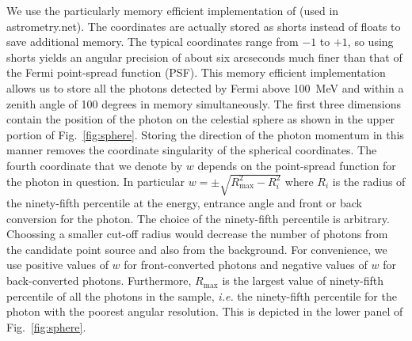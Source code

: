 \documentclass[useAMS,usenatbib]{mn2e}
\begin{document}
We use the particularly memory efficient implementation of
\citet{LangPhD} (used in astrometry.net).  The coordinates are
actually stored as shorts instead of floats to save additional memory.
The typical coordinates range from $-1$ to $+1$, so using shorts
yields an angular precision of about six arcseconds much finer than
that of the Fermi point-spread function (PSF).  This memory efficient
implementation allows us to store all the photons detected by Fermi
above 100~MeV and within a zenith angle of 100 degrees in memory
simultaneously.  The first three dimensions contain the position of
the photon on the celestial sphere as shown in the upper portion of
Fig.~\ref{fig:sphere}.  Storing the direction of the photon momentum
in this manner removes the coordinate singularity of the spherical
coordinates.
The fourth
coordinate that we denote by $w$ depends on the point-spread function
for the photon in question.  In particular $w=\pm
\sqrt{R^2_\mathrm{max}-R_i^2}$ where $R_i$ is the radius of the
ninety-fifth percentile at the energy, entrance angle and front or
back conversion for the photon.  The choice of the ninety-fifth
percentile is arbitrary.  Choossing a smaller cut-off radius would
decrease the number of photons from the candidate point source and also
from the background.  For convenience, we use positive values of $w$
for front-converted photons and negative values of $w$ for
back-converted photons.  Furthermore, $R_\mathrm{max}$ is the largest
value of ninety-fifth percentile of all the photons in the sample,
{\em i.e.} the ninety-fifth percentile for the photon with the poorest
angular resolution.  This is depicted in the lower panel of
Fig.~\ref{fig:sphere}.
\end{document}
